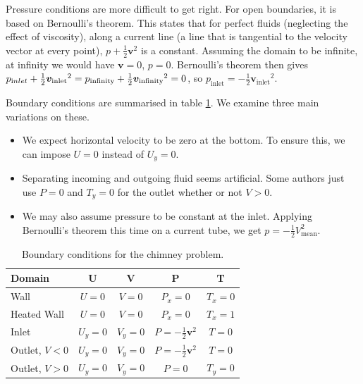 \documentclass[12pt]{article}
\newcommand{\vb}[1]{\ensuremath{\boldsymbol #1}}
\begin{document}
Pressure conditions are more difficult to get right. For open
boundaries, it is based on Bernoulli's theorem. This states that for
perfect fluids (neglecting the effect of viscosity), along a current
line (a line that is tangential to the velocity vector at every
point), $p + \frac{1}{2} \vb{v}^{2}$ is a constant. Assuming the
domain to be infinite, at infinity we would have $\vb{v} = 0$, $p =
0$. Bernoulli's theorem then gives $p_{\text inlet} + \frac 1 2 {\vb
  {v_{\text{inlet}}}}^{2} = p_{\text {infinity}} + \frac 1 2 {\vb
  {v_{\text{infinity}}}}^{2} = 0$, so $p_{\text{inlet}} = - \frac 1 2
{\vb v_{\text{inlet}}}^{2}$.

Boundary conditions are summarised in table \ref{table:bc}. We examine
three main variations on these.

\begin{itemize}
  \item We expect horizontal velocity to be zero at the bottom. To
    ensure this, we can impose $U = 0$ instead of $U_{y} = 0$.
  \item Separating incoming and outgoing fluid seems artificial. Some
    authors just use $P = 0$ and $T_{y} = 0$ for the outlet whether or
    not $V > 0$.
  \item We may also assume pressure to be constant at the
    inlet. Applying Bernoulli's theorem this time on a current tube,
    we get $p = - \frac 1 2 V_{\text{mean}}^{2}$.
\end{itemize}


\begin{table}[!h]
  \centering
  \begin{tabular}{|l|c|c|c|c|}
    \hline
    Domain & U & V & P & T \\
    \hline
    Wall         & $U = 0$     & $V = 0$     & $P_{x} = 0$             & $T_{x} = 0$ \\
    Heated Wall  & $U = 0$     & $V = 0$     & $P_{x} = 0$             & $T_{x} = 1$ \\
    Inlet           & $U_{y} = 0$ & $V_{y} = 0$ & $P = -\frac 1 2 {\vb{v}^{2}}$  & $T = 0$     \\
    Outlet, $V < 0$ & $U_{y} = 0$ & $V_{y} = 0$ & $P = -\frac 1 2 {\vb{v}^{2}} $ & $T = 0$     \\
    Outlet, $V > 0$ & $U_{y} = 0$ & $V_{y} = 0$ & $P = 0$                 & $T_y = 0$   \\
    \hline
  \end{tabular}
  \caption{Boundary conditions for the chimney problem.}
  \label{table:bc}
\end{table}
\end{document}

